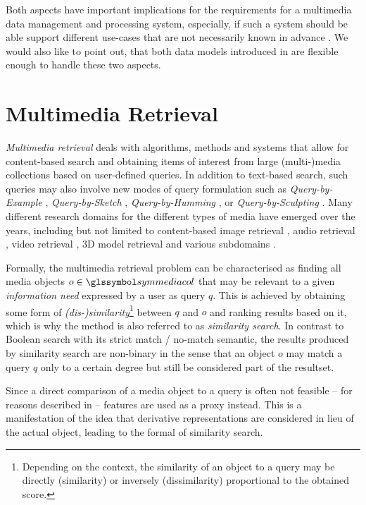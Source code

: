 Both aspects have important implications for the requirements for a multimedia data management and processing system, especially, if such a system should be able support different use-cases that are not necessarily known in advance \cite{Smeulders:2000Content}. We would also like to point out, that both data models introduced in  are flexible enough to handle these two aspects.

\section{Multimedia Retrieval}
\label{section:multimedia_retrieval}

\emph{Multimedia retrieval} deals with algorithms, methods and systems that allow for content-based search and obtaining items of interest from large (multi-)media collections based on user-defined queries. In addition to text-based search, such queries may also involve new modes of query formulation such as \emph{Query-by-Example} \cite{Kelly:1995Query}, \emph{Query-by-Sketch} \cite{Cao:2010mind}, \emph{Query-by-Humming} \cite{Ghias:1995query}, or \emph{Query-by-Sculpting} \cite{Boerlin:20203d}. Many different research domains for the different types of media have emerged over the years, including but not limited to content-based image retrieval \cite{Dharani:2013Survey}, audio retrieval \cite{Lu:2001Indexing}, video retrieval \cite{Hu:2011Survey}, 3D model retrieval \cite{Yang:2007Content} and various subdomains \cite{Murthy:2018Content}.

Formally, the multimedia retrieval problem can be characterised as finding all media objects $o \in \symmediacol$ that may be relevant to a given \emph{information need} expressed by a user as query $q$. This is achieved by obtaining some form of \emph{(dis-)similarity}\footnote{Depending on the context, the similarity of an object to a query may be directly (similarity) or inversely (dissimilarity) proportional to the obtained score.} between $q$ and $o$ and ranking results based on it, which is why the method is also referred to as \emph{similarity search}. In contrast to Boolean search with its strict match / no-match semantic, the results produced by similarity search are non-binary in the sense that an object $o$ may match a query $q$ only to a certain degree but still be considered part of the resultset.

Since a direct comparison of a media object to a query is often not feasible -- for reasons described in  -- features are used as a proxy instead. This is a manifestation of the idea that derivative representations are considered in lieu of the actual object, leading to the formal  of similarity search.


